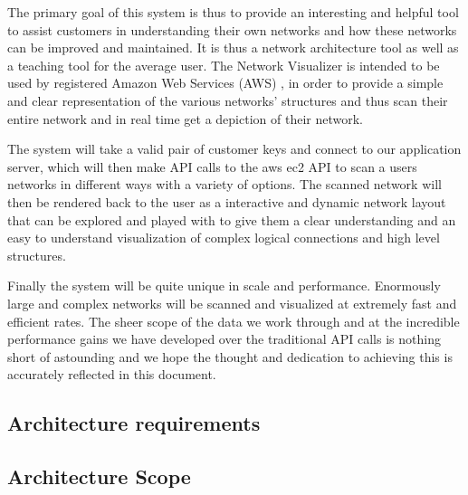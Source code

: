 \documentclass[hidelinks,a4paper,12pt]{article}
\begin{document}
The primary goal of this system is thus to provide an interesting and helpful tool to assist customers in understanding their own networks and how these networks can be improved and maintained. 
It is thus a network architecture tool as well as a teaching tool for the average user. The Network Visualizer is intended to be used by registered Amazon Web Services (AWS) , in order to provide a simple and clear representation of the various networks' structures and thus scan their entire network and in real time get a depiction of their network.

The system will take a valid pair of customer keys and connect to our application server, which will then make API calls to the aws ec2 API to scan a users networks in different ways with a variety of options. The scanned network will then be rendered back to the user as a interactive and dynamic network layout that can be explored and played with to give them a clear understanding and an easy to understand visualization of complex logical connections and high level structures.

Finally the system will be quite unique in scale and performance. Enormously large and complex networks will be scanned and visualized at extremely fast and efficient rates. The sheer scope of the data we work through and at the incredible performance gains we have developed over the traditional API calls is nothing short of astounding and we hope the thought and dedication to achieving this is accurately reflected in this document.


\subsection{Architecture requirements}


\subsection{Architecture Scope}
\end{document}
